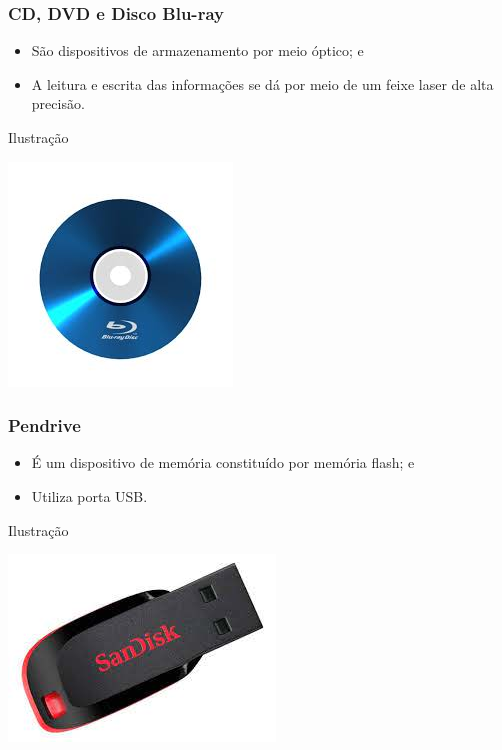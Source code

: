 \documentclass[aspectratio=169]{beamer} %
\begin{document}
\begin{frame}
	\frametitle{CD, DVD e Disco Blu-ray}
		
	\begin{itemize}
		\item São dispositivos de armazenamento por meio óptico; e
		\item A leitura e escrita das informações se dá por meio de um feixe laser de alta precisão.
	\end{itemize}\vfill
	
	\begin{exampleblock}{Ilustra\c cão}
		\begin{center}
			\includegraphics[scale=0.4]{img/cd}
		\end{center}
	\end{exampleblock}
\end{frame}

\begin{frame}
	\frametitle{Pendrive}
		
	\begin{itemize}
		\item É um dispositivo de memória constituído por memória flash; e 
		\item Utiliza porta USB.
	\end{itemize}\vfill
	
	\begin{exampleblock}{Ilustra\c cão}
		\begin{center}
			\includegraphics[scale=0.4]{img/pendrive}
		\end{center}
	\end{exampleblock}
\end{frame}
\end{document}

